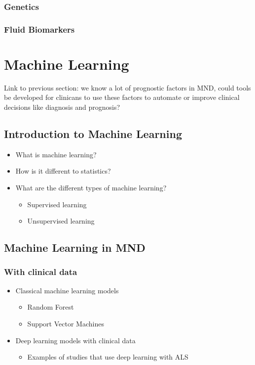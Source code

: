 



\subsubsection{Genetics}


\subsubsection{Fluid Biomarkers}



\section{Machine Learning}

Link to previous section: we know a lot of prognostic factors in MND, could tools be developed for clinicans to use these factors to automate or improve clinical decisions like diagnosis and prognosis?

\subsection{Introduction to Machine Learning}

\begin{itemize}
    \item What is machine learning?
    \item How is it different to statistics?
    \item What are the different types of machine learning?
    \begin{itemize}
        \item Supervised learning
        \item Unsupervised learning
    \end{itemize}
\end{itemize}

\subsection{Machine Learning in MND}

\subsubsection{With clinical data}

\begin{itemize}
    \item Classical machine learning models
    \begin{itemize}
        \item Random Forest
        \item Support Vector Machines
    \end{itemize}
    \item Deep learning models with clinical data
    \begin{itemize}
        \item Examples of studies that use deep learning with ALS
    \end{itemize}
\end{itemize}


